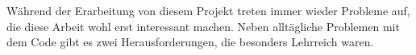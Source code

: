 \documentclass[../main.tex]{subfiles}
\begin{document}
Während der Erarbeitung von diesem Projekt treten immer wieder Probleme auf, die diese Arbeit wohl erst interessant machen.
Neben alltägliche Problemen mit dem Code gibt es zwei Herausforderungen, die besonders Lehrreich waren.
\end{document}

